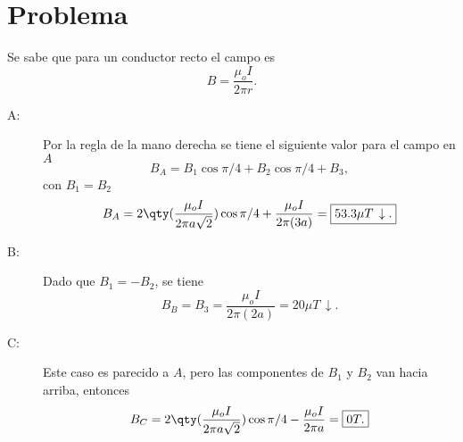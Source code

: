 \section*{Problema}
Se sabe que para un conductor recto el campo es
	$$ B = \frac{\mu _o I}{2\pi r}. $$
\begin{description}
	\item[A:] Por la regla de la mano derecha se tiene el siguiente valor para el campo en $A$
		$$ B_A = B_1 \cos{\pi /4} + B_2 \cos{\pi /4} + B_3, $$
			con $B_1 = B_2$
				$$ B_A = 2\qty(\frac{\mu _o I}{2\pi a\sqrt{2}}) \cos{\pi /4} + \frac{\mu _o I}{2\pi (3a)} = \boxed{ 53.3\mu T \, \downarrow . } $$
	\item[B:] Dado que $B_1 = -B_2$, se tiene
		$$ B_B = B_3 = \frac{\mu _o I}{2\pi (2a)} = \boxed{ 20\mu T \, \downarrow . } $$
	\item[C:] Este caso es parecido a $A$, pero las componentes de $B_1$ y $B_2$ van hacia arriba, entonces
		$$ B_C = 2\qty(\frac{\mu _o I}{2\pi a\sqrt{2}}) \cos{\pi /4} - \frac{\mu _o I}{2\pi a} = \boxed{ 0T. } $$
\end{description}




